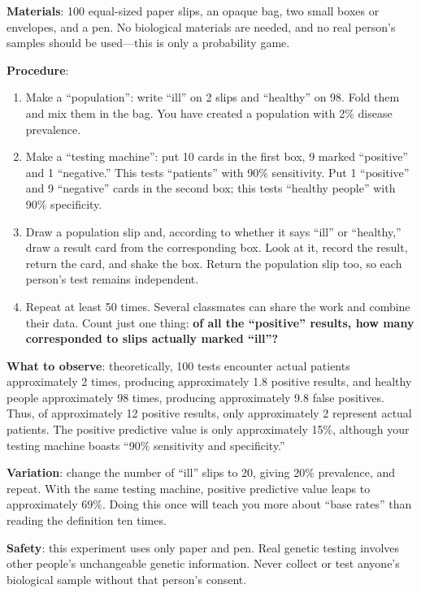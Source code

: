 \begin{shiyan}
\textbf{Materials}: 100 equal-sized paper slips, an opaque bag, two small boxes or envelopes, and a pen. No biological materials are needed, and no real person's samples should be used---this is only a probability game.

\textbf{Procedure}:
\begin{enumerate}[itemsep=1pt]
\item Make a ``population'': write ``ill'' on 2 slips and ``healthy'' on 98. Fold them and mix them in the bag. You have created a population with 2\% disease prevalence.
\item Make a ``testing machine'': put 10 cards in the first box, 9 marked ``positive'' and 1 ``negative.'' This tests ``patients'' with 90\% sensitivity. Put 1 ``positive'' and 9 ``negative'' cards in the second box; this tests ``healthy people'' with 90\% specificity.
\item Draw a population slip and, according to whether it says ``ill'' or ``healthy,'' draw a result card from the corresponding box. Look at it, record the result, return the card, and shake the box. Return the population slip too, so each person's test remains independent.
\item Repeat at least 50 times. Several classmates can share the work and combine their data. Count just one thing: \textbf{of all the ``positive'' results, how many corresponded to slips actually marked ``ill''?}
\end{enumerate}

\textbf{What to observe}: theoretically, 100 tests encounter actual patients approximately 2 times, producing approximately 1.8 positive results, and healthy people approximately 98 times, producing approximately 9.8 false positives. Thus, of approximately 12 positive results, only approximately 2 represent actual patients. The positive predictive value is only approximately 15\%, although your testing machine boasts ``90\% sensitivity and specificity.''

\textbf{Variation}: change the number of ``ill'' slips to 20, giving 20\% prevalence, and repeat. With the same testing machine, positive predictive value leaps to approximately 69\%. Doing this once will teach you more about ``base rates'' than reading the definition ten times.

\textbf{Safety}: this experiment uses only paper and pen. Real genetic testing involves other people's unchangeable genetic information. Never collect or test anyone's biological sample without that person's consent.
\end{shiyan}

